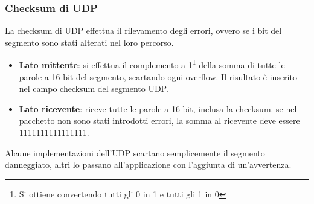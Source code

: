 \documentclass[11pt,a4paper]{article}
\begin{document}
\subsubsection{Checksum di UDP}
La checksum di UDP effettua il rilevamento degli errori, ovvero se i bit del segmento sono stati alterati nel loro percorso. \\
\begin{itemize}
	\item \textbf{Lato mittente}: si effettua il complemento a 1\footnote{Si ottiene convertendo tutti gli 0 in 1 e tutti gli 1 in 0} della somma di tutte le parole a 16 bit del segmento, scartando ogni overflow. Il risultato è inserito nel campo checksum del segmento UDP.
	\item \textbf{Lato ricevente}: riceve tutte le parole a 16 bit, inclusa la checksum. se nel pacchetto non sono stati introdotti errori, la somma al ricevente deve essere 1111111111111111. \\
\end{itemize}
Alcune implementazioni dell'UDP scartano semplicemente il segmento danneggiato, altri lo passano all'applicazione con l'aggiunta di un'avvertenza.
\end{document}
